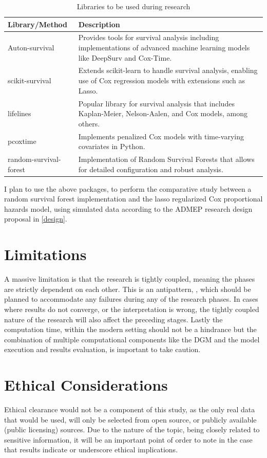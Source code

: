 \begin{table}[h]
\begin{tabularx}{\textwidth}{|X|X|}
\hline
Library/Method & Description \\
\hline
Auton-survival \parencite{nagpal_auton-survival_2022} & Provides tools for survival analysis including implementations of advanced machine learning models like DeepSurv and Cox-Time. \\
\hline
scikit-survival \parencite{sebastian_polsterl_scikit-survival_2023} & Extends scikit-learn \parencite{scikit-learn} to handle survival analysis, enabling use of Cox regression models with extensions such as Lasso. \\
\hline
lifelines \parencite{davidson-pilon_lifelines_2024} & Popular library for survival analysis that includes Kaplan-Meier, Nelson-Aalen, and Cox models, among others. \\
\hline
pcoxtime \parencite{cygu_pcoxtime_2021} & Implements penalized Cox models with time-varying covariates in Python. \\
\hline
random-survival-forest \parencite{spath_julianspaethrandom-survival-forest_2021} & Implementation of Random Survival Forests that allows for detailed configuration and robust analysis. \\
\hline
\end{tabularx}
\caption{Libraries to be used during research}
\label{tab:libs}
\end{table}

\noindent I plan to use the above packages, to perform the comparative study between a random survival forest implementation and the lasso regularized Cox proportional hazards model, using simulated data according to the ADMEP research design proposal in \ref{design}.

\section{Limitations} \label{methlim}
A massive limitation is that the research is tightly coupled, meaning the phases are strictly dependent on each other. This is an antipattern, \parencite{joshi_beginning_2016}, which should be planned to accommodate any failures during any of the research phases. In cases where results do not converge, or the interpretation is wrong, the tightly coupled nature of the research will also affect the preceding stages. Lastly the computation time, within the modern setting should not be a hindrance but the combination of multiple computational components like the DGM and the model execution and results evaluation, is important to take caution. 

\section{Ethical Considerations}
Ethical clearance would not be a component of this study, as the only real data that would be used, will only be selected from open source, or publicly available (public licensing) sources. Due to the nature of the topic, being closely related to sensitive information, it will be an important point of order to note in the case that results indicate or underscore ethical implications.
